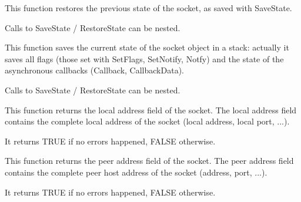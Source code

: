 
%
%
\label{wxsocketbaserestorestate}


This function restores the previous state of the socket, as saved
with SaveState.

Calls to SaveState / RestoreState can be nested.



%
%
\label{wxsocketbasesavestate}


This function saves the current state of the socket object in a stack:
actually it saves all flags (those set with SetFlags, SetNotify, Notfy)
and the state of the asynchronous callbacks (Callback, CallbackData).

Calls to SaveState / RestoreState can be nested.



%
%


This function returns the local address field of the socket. The local
address field contains the complete local address of the socket (local
address, local port, ...).


It returns TRUE if no errors happened, FALSE otherwise.

%
%


This function returns the peer address field of the socket. The peer 
address field contains the complete peer host address of the socket
(address, port, ...).


It returns TRUE if no errors happened, FALSE otherwise.

